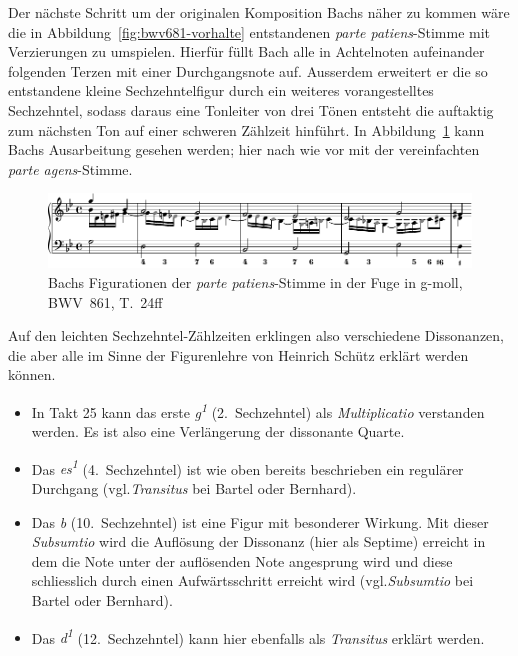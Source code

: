 Der nächste Schritt um der originalen Komposition Bachs näher zu kommen wäre die in Abbildung~\ref{fig:bwv681-vorhalte} entstandenen \emph{parte patiens}-Stimme mit Verzierungen zu umspielen.
Hierfür füllt Bach alle in Achtelnoten aufeinander folgenden Terzen mit einer Durchgangsnote auf.
Ausserdem erweitert er die so entstandene kleine Sechzehntelfigur durch ein weiteres vorangestelltes Sechzehntel, sodass daraus eine Tonleiter von drei Tönen entsteht die auftaktig zum nächsten Ton auf einer schweren Zählzeit hinführt.
In Abbildung~\ref{fig:bwv681-patiens-verziert} kann Bachs Ausarbeitung gesehen werden; hier nach wie vor mit der vereinfachten \emph{parte agens}-Stimme.

\begin{figure}[htbp]
	\centering
	\includegraphics{lilypond/g-moll/render/romanesca-patiens-verziert}
	\caption{Bachs Figurationen der \emph{parte patiens}-Stimme in der Fuge in g-moll, BWV~861, T.~24ff}
	\label{fig:bwv681-patiens-verziert}
\end{figure}

Auf den leichten Sechzehntel-Zählzeiten erklingen also verschiedene Dissonanzen, die aber alle im Sinne der Figurenlehre von Heinrich Schütz\autocite{bernhard:kompositionslehre} erklärt werden können.

\begin{itemize}
\item
	In Takt 25 kann das erste \emph{g\textsuperscript{1}} (2.~Sechzehntel) als \emph{Multiplicatio}\autocite[203f]{bartel:figurenlehre}\autocite[75]{bernhard:kompositionslehre} verstanden werden.
	Es ist also eine Verlängerung der dissonante Quarte.
\item
	Das \emph{es\textsuperscript{1}} (4.~Sechzehntel) ist wie oben bereits beschrieben ein regulärer Durchgang (vgl.\emph{Transitus} bei Bartel\autocite[260ff]{bartel:figurenlehre} oder Bernhard\autocite[64f]{bernhard:kompositionslehre}).
\item
	Das \emph{b} (10.~Sechzehntel) ist eine Figur mit besonderer Wirkung.
	Mit dieser \emph{Subsumtio} wird die Auflösung der Dissonanz (hier als Septime) erreicht in dem die Note unter der auflösenden Note angesprung wird und diese schliesslich durch einen Aufwärtsschritt erreicht wird (vgl.\emph{Subsumtio} bei Bartel\autocite[242ff]{bartel:figurenlehre} oder Bernhard\autocite[148f]{bernhard:kompositionslehre}).
\item
	Das \emph{d\textsuperscript{1}} (12.~Sechzehntel) kann hier ebenfalls als \emph{Transitus} erklärt werden.
\end{itemize}

